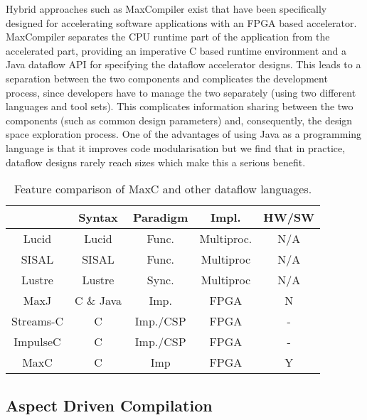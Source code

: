 Hybrid approaches such as MaxCompiler \cite{MaxelerTechnologies:2012}
exist that have been specifically designed for accelerating software
applications with an FPGA based accelerator. MaxCompiler separates the
CPU runtime part of the application from the accelerated part,
providing an imperative C based runtime environment and a Java
dataflow API for specifying the dataflow accelerator designs. This
leads to a separation between the two components and complicates the
development process, since developers have to manage the two
separately (using two different languages and tool sets). This
complicates information sharing between the two components (such as
common design parameters) and, consequently, the design space
exploration process. One of the advantages of using Java as a
programming language is that it improves code modularisation but we
find that in practice, dataflow designs rarely reach sizes which make
this a serious benefit.

\begin{table}[!h]
  \renewcommand{\arraystretch}{1.3}
  \centering
  \caption{Feature comparison of MaxC and other dataflow languages.}
  \label{table:feature-comparison}
  \begin{tabular}{ c |  c |  c |  c |  c }
    \hline
    \         & \bf{Syntax} & \bf{Paradigm} & \bf{Impl.} & \bf{HW/SW} \\
    \hline \hline
    Lucid     & Lucid       & Func.         & Multiproc. & N/A        \\
    SISAL     & SISAL       & Func.         & Multiproc  & N/A        \\
    Lustre    & Lustre      & Sync.         & Multiproc  & N/A        \\
    MaxJ      & C \& Java   & Imp.          & FPGA       & N          \\
    Streams-C & C           & Imp./CSP      & FPGA       & -          \\
    ImpulseC  & C           & Imp./CSP      & FPGA       & -          \\
    MaxC      & C           & Imp           & FPGA       & Y          \\
  \end{tabular}
\end{table}

\subsection{Aspect Driven Compilation}

